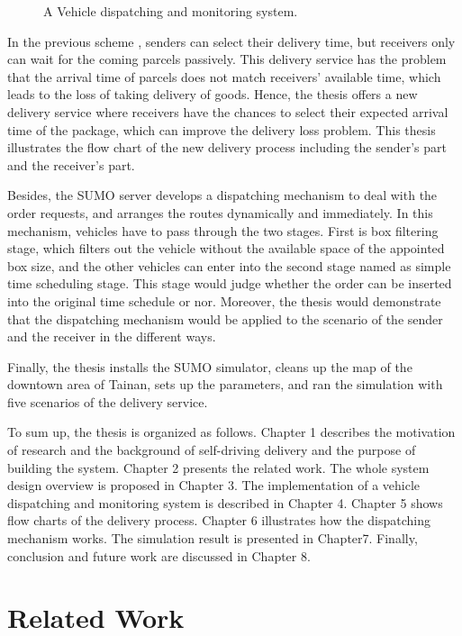 \documentclass[12pt]{ksthesis}
\begin{document}
\begin{thesis}
{\begin{figure}[t!]
\caption{\large A Vehicle dispatching and monitoring system.}
\vspace{0.5cm}
\label{Fig:System_Overview}
\end{figure}

In the previous scheme \cite{Jiang2018}, senders can select their delivery time, but receivers only can wait for the coming parcels passively. This delivery service has the problem that the arrival time of parcels does not match receivers’ available time, which leads to the loss of taking delivery of goods. Hence, the thesis offers a new delivery service where receivers have the chances to select their expected arrival time of the package, which can improve the delivery loss problem. This thesis illustrates the flow chart of the new delivery process including the sender’s part and the receiver’s part.

Besides, the SUMO server develops a dispatching mechanism to deal with the order requests, and arranges the routes dynamically and immediately. In this mechanism, vehicles have to pass through the two stages. First is box filtering stage, which filters out the vehicle without the available space of the appointed box size, and the other vehicles can enter into the second stage named as simple time scheduling stage. This stage would judge whether the order can be inserted into the original time schedule or nor. Moreover, the thesis would demonstrate that the dispatching mechanism would be applied to the scenario of the sender and the receiver in the different ways.

Finally, the thesis installs the SUMO simulator, cleans up the map of the downtown area of Tainan, sets up the parameters, and ran the simulation with five scenarios of the delivery service.

To sum up, the thesis is organized as follows. Chapter 1 describes the motivation of research and the background of self-driving delivery and the purpose of building the system. Chapter 2 presents the related work. The whole system design overview is proposed in Chapter 3. The implementation of a vehicle dispatching and monitoring system is described in Chapter 4. Chapter 5 shows flow charts of the delivery process.  Chapter 6 illustrates how the dispatching mechanism works. The simulation result is presented in Chapter7. Finally, conclusion and future work are discussed in Chapter 8.


  


\chapter{Related Work} \label{Chap:Related}

}
\end{thesis}
\end{document}
